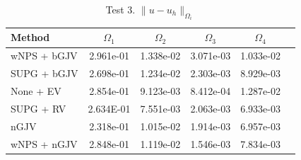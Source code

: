 \begin{table}
\centering
\begin{tabular}{lccccc}
\hline
Method &  $\Omega_1$ &  $\Omega_2$ &  $\Omega_3$ &  $\Omega_4$\\\hline
wNPS + bGJV  &  2.961e-01 & 1.338e-02
&  3.071e-03
&  1.033e-02\\

SUPG + bGJV  &
  2.698e-01    
  & 1.234e-02
  & 2.303e-03
  & 8.929e-03 \\
    None + EV  &
  2.854e-01     
&  9.123e-03
&  8.412e-04
&  1.287e-02\\

SUPG + RV  &
  2.634E-01     
&  7.551e-03
&  2.063e-03
&  6.933e-03 \\
nGJV  &
  2.318e-01     
&  1.015e-02
&  1.914e-03
&  6.957e-03\\

wNPS + nGJV  &
  2.848e-01     
&  1.119e-02
&  1.546e-03
&  7.834e-03\\
\hline
\end{tabular}
\caption{Test 3. $\|u-u_h\|_{\Omega_i}$}\label{tab-ex15_malla2D_new}
\end{table}
